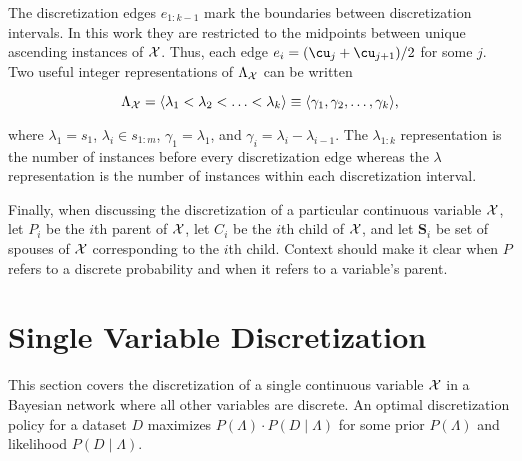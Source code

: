 The discretization edges $e_{1:k-1}$ mark the boundaries between discretization intervals.
In this work they are restricted to the midpoints between unique ascending instances of $\mathcal{X}$.
Thus, each edge $e_i = \paren{\cu_{j} + \cu_{{j+1}}}/2$ for some $j$.
Two useful integer representations of $\Lambda_{\mathcal{X}}$ can be written

\begin{equation}
\label{eq:disc_def}
  \Lambda_{\mathcal{X}} = \langle \lambda_1 < \lambda_2  < \ldots < \lambda_k \rangle \equiv \langle \gamma_1 , \gamma_2  , \ldots , \gamma_k \rangle\text{,}
\end{equation}

\noindent
where $\lambda_1 = s_1$, $\lambda_i \in s_{1:m}$, $\gamma_1 = \lambda_1$, and $\gamma_i = \lambda_i - \lambda_{i-1}$.
The $\lambda_{1:k}$ representation is the number of instances before every discretization edge whereas the $\lambda$ representation is the number of instances within each discretization interval.

Finally, when discussing the discretization of a particular continuous variable $\mathcal{X}$, let $P_i$ be the $i$th parent of $\mathcal{X}$, let $C_i$ be the $i$th child of $\mathcal{X}$, and let $\bm{S}_i$ be set of spouses of $\mathcal{X}$ corresponding to the $i$th child.
Context should make it clear when $P$ refers to a discrete probability and when it refers to a variable's parent.


\section{Single Variable Discretization}
\label{sec:single_var}

This section covers the discretization of a single continuous variable $\mathcal{X}$ in a Bayesian network where all other variables are discrete.
An optimal discretization policy for a dataset $D$ maximizes $P(\Lambda)\cdot P(D\mid \Lambda)$ for some prior $P(\Lambda)$ and likelihood $P(D\mid \Lambda)$.



